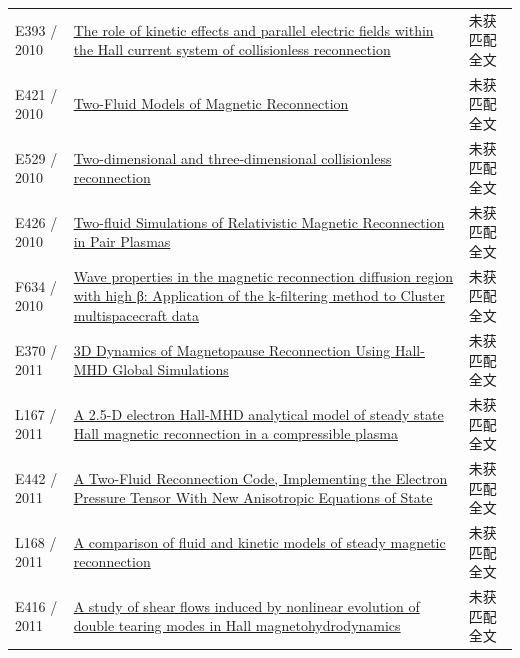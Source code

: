 \begin{longtable}{P{24mm}P{97mm}P{27mm}}
E393 / 2010 & \href{https://ui.adsabs.harvard.edu/abs/2010APS..DPPCP9128E/abstract}{The role of kinetic effects and parallel electric fields within the Hall current system of collisionless reconnection} & 未获匹配全文\\

E421 / 2010 & \href{https://research.manchester.ac.uk/en/studentTheses/d99f1bda-cb55-47e2-8d82-ebe240e98456}{Two-Fluid Models of Magnetic Reconnection} & 未获匹配全文\\

E529 / 2010 & \href{http://edoc.mpg.de/472531}{Two-dimensional and three-dimensional collisionless reconnection} & 未获匹配全文\\

E426 / 2010 & \href{https://ui.adsabs.harvard.edu/abs/2010AAS...21545326Z/abstract}{Two-fluid Simulations of Relativistic Magnetic Reconnection in Pair Plasmas} & 未获匹配全文\\

F634 / 2010 & \href{https://doi.org/10.1029/2010ja015335}{Wave properties in the magnetic reconnection diffusion region with high β: Application of the k‐filtering method to Cluster multispacecraft data} & 未获匹配全文\\

E370 / 2011 & \href{http://ui.adsabs.harvard.edu/abs/2011AGUFMSM21A1983M/abstract}{3D Dynamics of Magnetopause Reconnection Using Hall-MHD Global Simulations} & 未获匹配全文\\

L167 / 2011 & \href{https://doi.org/10.1029/2010ja015942}{A 2.5-D electron Hall-MHD analytical model of steady state Hall magnetic reconnection in a compressible plasma} & 未获匹配全文\\

E442 / 2011 & \href{http://absimage.aps.org/image/DPP11/MWS_DPP11-2011-000787.pdf}{A Two-Fluid Reconnection Code,  Implementing the Electron Pressure Tensor With New Anisotropic Equations of State} & 未获匹配全文\\

L168 / 2011 & \href{https://doi.org/10.1063/1.3568828}{A comparison of fluid and kinetic models of steady magnetic reconnection} & 未获匹配全文\\

E416 / 2011 & \href{https://doi.org/10.1140/epjd/e2011-20106-4}{A study of shear flows induced by nonlinear evolution of double tearing modes in Hall magnetohydrodynamics} & 未获匹配全文\\


\end{longtable}

